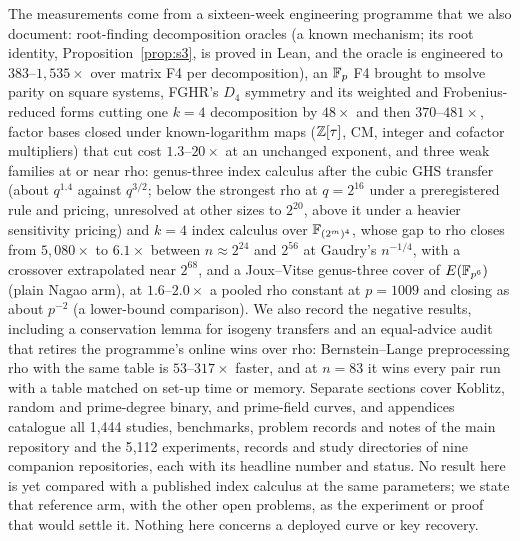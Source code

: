 The measurements come from a sixteen-week engineering programme that we also
document: root-finding decomposition oracles (a known mechanism; its root
identity, Proposition~\ref{prop:s3}, is proved in Lean, and the oracle is
engineered to $383$--$1{,}535\times$ over matrix F4 per decomposition),
an $\mathbb{F}_p$ F4 brought to msolve parity on square systems, FGHR's $D_4$
symmetry and its weighted and Frobenius-reduced forms cutting one $k=4$
decomposition by $48\times$ and then $370$--$481\times$, factor bases closed
under known-logarithm maps ($\mathbb{Z}[\tau]$, CM, integer and cofactor
multipliers) that cut cost $1.3$--$20\times$ at an unchanged exponent, and
three weak families at or near rho: genus-three index calculus
after the cubic GHS transfer (about $q^{1.4}$ against $q^{3/2}$; below the
strongest rho at $q=2^{16}$ under a preregistered rule and pricing, unresolved
at other sizes to $2^{20}$, above it under a heavier sensitivity pricing) and $k=4$ index calculus over $\mathbb{F}_{(2^m)^4}$, whose
gap to rho closes from $5{,}080\times$ to $6.1\times$ between $n\approx2^{24}$
and $2^{56}$ at Gaudry's $n^{-1/4}$, with a crossover extrapolated near
$2^{68}$, and a Joux--Vitse genus-three cover of $E(\mathbb{F}_{p^6})$ (plain Nagao arm), at
$1.6$--$2.0\times$ a pooled rho constant at $p=1009$ and closing as about
$p^{-2}$ (a lower-bound comparison). We also record the negative results, including a
conservation lemma for isogeny transfers and an equal-advice audit that
retires the programme's online wins over rho: Bernstein--Lange
preprocessing rho with the same table is $53$--$317\times$ faster, and at
$n=83$ it wins every pair run with a table matched on set-up time or
memory. Separate sections cover Koblitz, random and prime-degree binary,
and prime-field curves, and appendices catalogue all 1{,}444 studies,
benchmarks, problem records and notes of the main repository and the
5{,}112 experiments, records and study directories of nine companion
repositories, each with its headline number and status. No result here
is yet compared with a published index calculus at the same parameters;
we state that reference arm, with the other open problems, as the
experiment or proof that would settle it. Nothing here concerns a
deployed curve or key recovery.
